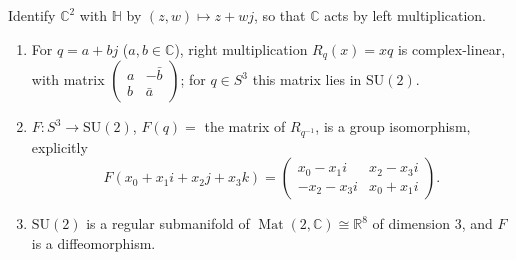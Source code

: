 \documentclass[11pt]{report}
\makeatletter
\newcounter{thmcounter}[section]
\newcommand{\thmlabel}[1]{\edef\@currentlabel{\arabic{section}.\arabic{thmcounter}}\label{#1}}
\DeclareMathOperator{\Mat}{Mat}
\makeatother
\begin{document}
\begin{propbox}[$S^3$ Is $\mathrm{SU}(2)$]\thmlabel{prop:s3-su2}
Identify $\mathbb{C}^2$ with $\mathbb{H}$ by $(z, w) \mapsto z + wj$, so that $\mathbb{C}$ acts by left multiplication.
\begin{enumerate}
    \item For $q = a + bj$ ($a, b \in \mathbb{C}$), right multiplication $R_q(x) = xq$ is complex-linear, with matrix $\begin{pmatrix} a & -\bar b \\ b & \bar a \end{pmatrix}$; for $q \in S^3$ this matrix lies in $\mathrm{SU}(2)$.
    \item $F : S^3 \to \mathrm{SU}(2)$, $F(q) = $ the matrix of $R_{q^{-1}}$, is a group isomorphism, explicitly
    \[
    F(x_0 + x_1 i + x_2 j + x_3 k) = \begin{pmatrix} x_0 - x_1 i & x_2 - x_3 i \\ -x_2 - x_3 i & x_0 + x_1 i \end{pmatrix}.
    \]
    \item $\mathrm{SU}(2)$ is a regular submanifold of $\Mat(2, \mathbb{C}) \cong \mathbb{R}^8$ of dimension $3$, and $F$ is a diffeomorphism.
\end{enumerate}
\end{propbox}
\end{document}
